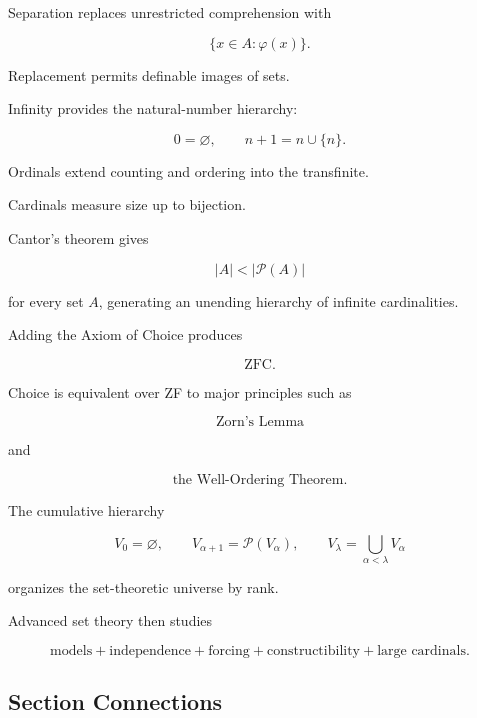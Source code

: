 Separation replaces unrestricted comprehension with

\[
\boxed{
\{x\in A:\varphi(x)\}.
}
\]

Replacement permits definable images of sets.

Infinity provides the natural-number hierarchy:

\[
\boxed{
0=\varnothing,
\qquad
n+1=n\cup\{n\}.
}
\]

Ordinals extend counting and ordering into the transfinite.

Cardinals measure size up to bijection.

Cantor's theorem gives

\[
\boxed{
|A|
<
|\mathcal{P}(A)|
}
\]

for every set \(A\), generating an unending hierarchy of infinite
cardinalities.

Adding the Axiom of Choice produces

\[
\boxed{
\mathrm{ZFC}.
}
\]

Choice is equivalent over ZF to major principles such as

\[
\boxed{
\text{Zorn's Lemma}
}
\]

and

\[
\boxed{
\text{the Well-Ordering Theorem}.
}
\]

The cumulative hierarchy

\[
\boxed{
V_0=\varnothing,
\qquad
V_{\alpha+1}=\mathcal{P}(V_\alpha),
\qquad
V_\lambda=\bigcup_{\alpha<\lambda}V_\alpha
}
\]

organizes the set-theoretic universe by rank.

Advanced set theory then studies

\[
\boxed{
\text{models}
+
\text{independence}
+
\text{forcing}
+
\text{constructibility}
+
\text{large cardinals}.
}
\]

\subsection{Section Connections}
\label{subsec:axiomatic-set-theory-connections}


